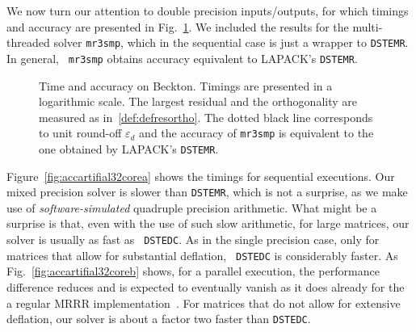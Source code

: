\documentclass[final]{siamltex}
\begin{document}
We now turn our attention to double precision inputs/outputs, for which timings and
accuracy are presented in Fig.~\ref{fig:accartifial32core}. 
We included the results for the multi-threaded solver {\tt mr3smp}, which 
in the sequential case is just a wrapper to {\tt DSTEMR}. In general,  {\tt
  mr3smp} obtains accuracy equivalent to 
LAPACK's {\tt DSTEMR}.  
\begin{figure}[tbh]
   \centering   
    

    
   \caption{
     Time and accuracy on {\sc Beckton}. Timings are presented in a
     logarithmic scale. The largest residual and the orthogonality are
     measured as in~\eqref{def:defresortho}. The dotted black line
     corresponds to unit round-off $\varepsilon_d$ and the accuracy of {\tt mr3smp} is
     equivalent to the one obtained by LAPACK's {\tt DSTEMR}.   
   }
   \label{fig:accartifial32core}
\end{figure}

Figure~\ref{fig:accartifial32corea} shows the timings for 
sequential executions. Our mixed precision solver is slower than {\tt DSTEMR}, which is not
a surprise, as we make use of {\it software-simulated} quadruple precision
arithmetic. What might be a surprise is that, even with the use of such slow
arithmetic, for large matrices, our solver is usually as fast as {\tt
  DSTEDC}. As in the single precision case, only for matrices that allow
for substantial deflation, {\tt
  DSTEDC} is considerably faster. As Fig.~\ref{fig:accartifial32coreb}
shows, for a parallel execution, the performance difference reduces and is
expected to eventually vanish as it does already for the a regular MRRR
implementation~\cite{EleMRRR}. For matrices that do not allow for extensive
deflation, our solver is about a factor two faster than {\tt DSTEDC}. 
\end{document}
